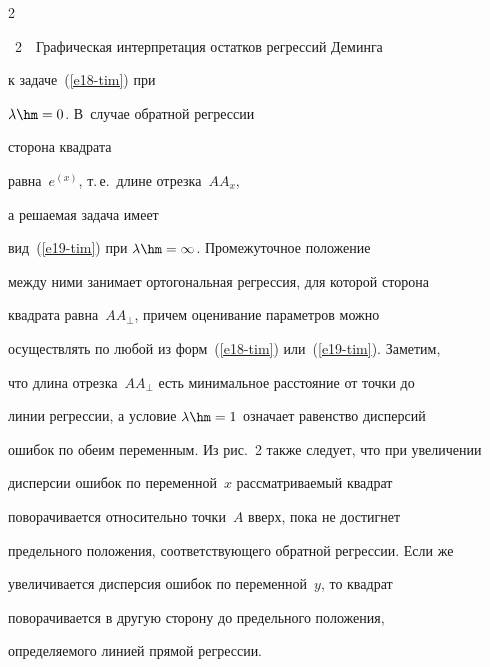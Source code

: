 \begin{multicols}{2}

{{\figurename~2}\ \ \small{Графическая интерпретация остатков регрессий Деминга}}












\vspace*{15pt}



\addtocounter{figure}{1}



\noindent

 к задаче~(\ref{e18-tim}) при

$\lambda\hm=0$. В~случае обратной регрессии

 сторона квадрата

равна~$e^{(x)}$, т.\,е.\ длине отрезка~$AA_x$,

а решаемая задача имеет

вид~(\ref{e19-tim}) при $\lambda \hm =\infty$. Промежуточное положение

между ними занимает ортогональная регрессия, для которой сторона

квадрата равна~$AA_{\perp}$, причем оценивание параметров можно

осуществлять по любой из форм~(\ref{e18-tim}) или~(\ref{e19-tim}). Заметим,

что длина отрезка~$AA_{\perp}$ есть минимальное расстояние от точки до

линии регрессии, а условие $\lambda\hm=1$ означает равенство дисперсий

ошибок по обеим переменным. Из рис.~2 также следует, что при увеличении

дисперсии ошибок по переменной~$x$ рассматриваемый квадрат

поворачивается относительно точки~$A$ вверх, пока не достигнет

предельного положения, соответствующего обратной регрессии. Если же

увеличивается дисперсия ошибок по переменной~$y$, то квадрат

поворачивается в другую сторону до предельного положения,

определяемого линией прямой регрессии.



 




\end{multicols}
